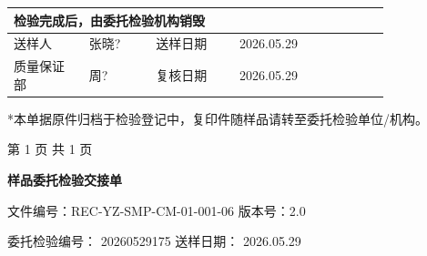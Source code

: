 \documentclass[UTF8,10pt,a4paper,fontset=fandol]{ctexart}
\newcommand{\fieldvalue}[1]{#1}
\newcommand{\handwritten}[1]{#1}
\begin{document}
\begin{center}
\begin{tabular}{|p{0.18\linewidth}|p{0.16\linewidth}|p{0.20\linewidth}|p{0.10\linewidth}|p{0.18\linewidth}|}
\multicolumn{4}{l|}{
\fieldvalue{检验完成后，由委托检验机构销毁}
}\\
\hline
送样人 &
\fieldvalue{\handwritten{张晓?}}
&
送样日期 &
\fieldvalue{\handwritten{2026.05.29}}
\\
\hline
质量保证部 &
\fieldvalue{\handwritten{周?}}
&
复核日期 &
\fieldvalue{\handwritten{2026.05.29}}
\\
\hline
\end{tabular}
\end{center}

{\footnotesize
*本单据原件归档于检验登记中，复印件随样品请转至委托检验单位/机构。
}

\begin{center}
{\small 第 1 页 共 1 页}
\end{center}

\newpage

\begin{center}
\textbf{样品委托检验交接单}
\end{center}

\noindent
文件编号：REC-YZ-SMP-CM-01-001-06 \qquad 版本号：2.0

\noindent
委托检验编号：
\fieldvalue{20260529175}
\hfill
送样日期：
\fieldvalue{2026.05.29}

\medskip
\end{document}

